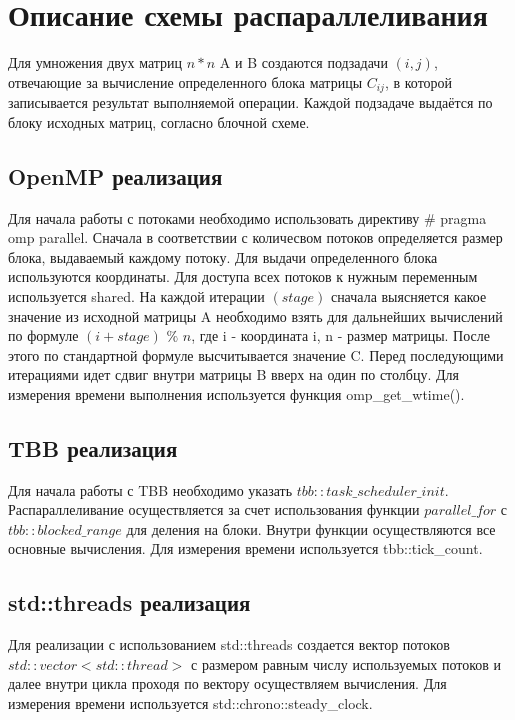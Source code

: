 \documentclass{report}
\begin{document}
\newpage

\section*{Описание схемы распараллеливания}

Для умножения двух матриц $n*n$ A и B создаются подзадачи $(i,j)$, отвечающие за вычисление определенного блока матрицы $C_{ij}$, в которой записывается результат выполняемой операции. Каждой подзадаче выдаётся по блоку исходных матриц, согласно блочной схеме.

\subsection*{OpenMP реализация}
Для начала работы с потоками необходимо использовать директиву $\#$ pragma omp parallel. Сначала в соответствии с количесвом потоков определяется размер блока, выдаваемый каждому потоку. Для выдачи определенного блока используются координаты. Для доступа всех потоков к нужным переменным используется shared. На каждой итерации $(stage)$ сначала выясняется какое значение из исходной матрицы A необходимо взять для дальнейших вычислений по формуле $ (i + stage)$ $\%$ $n$, где i - координата i, n - размер матрицы. После этого по стандартной формуле высчитывается значение C. Перед последующими итерациями идет сдвиг внутри матрицы B вверх на один по столбцу. Для измерения времени выполнения используется функция omp\_get\_wtime().

\subsection*{TBB реализация}
Для начала работы с TBB необходимо указать $tbb::task\_scheduler\_init$. Распараллеливание осуществляется за счет использования функции $parallel\_for$ с $tbb::blocked\_range$ для деления на блоки. Внутри функции осуществляются все основные вычисления. Для измерения времени используется tbb::tick\_count.


\subsection*{std::threads реализация}
Для реализации с использованием std::threads  создается вектор потоков $std::vector<std::thread>$ с размером равным числу используемых потоков и далее внутри цикла проходя по вектору осуществляем вычисления. Для измерения времени используется std::chrono::steady\_clock.
\end{document}

